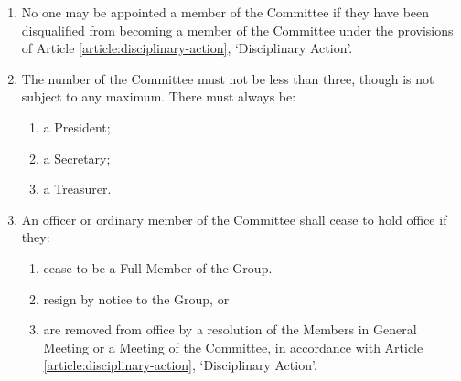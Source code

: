 \documentclass[12pt]{constitution}
\begin{document}
\begin{enumerate}
    \item No one may be appointed a member of the Committee if they have been disqualified from becoming a member of the Committee under the provisions of Article \ref{article:disciplinary-action}, `Disciplinary Action'.
    \item The number of the Committee must not be less than three, though is not subject to any maximum. There must always be:
    \begin{enumerate}
        \item a President;
        \item a Secretary;
        \item a Treasurer.
    \end{enumerate}

    \item An officer or ordinary member of the Committee shall cease to hold office if they:
    \begin{enumerate}
        \item cease to be a Full Member of the Group.
        \item resign by notice to the Group, or
        \item are removed from office by a resolution of the Members in General Meeting or a Meeting of the Committee, in accordance with Article \ref{article:disciplinary-action}, `Disciplinary Action'.
    \end{enumerate}
\end{enumerate}


\label{article:meetings-committee}
\end{document}
